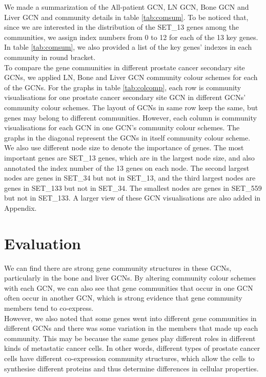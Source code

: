 \documentclass[12pt,a4paper]{report}
\begin{document}
We made a summarization of the All-patient GCN, LN GCN, Bone GCN and Liver GCN and community details in table \ref{tab:comsum}.  To be noticed that, since we are interested in the distribution of the SET\_13 genes among the communities, we assign index numbers from 0 to 12 for each of the 13 key genes. In table \ref{tab:comsum}, we also provided a list of the key genes' indexes in each community in round bracket.\\

To compare the gene communities in different prostate cancer secondary site GCNs, we applied LN, Bone and Liver GCN community colour schemes for each of the GCNs. For the graphs in table \ref{tab:colcomp}, each row is community visualisations for one prostate cancer secondary site GCN in different GCNs’ community colour schemes. The layout of GCNs in same row keep the same, but genes may belong to different communities. However, each column is community visualisations for each GCN in one GCN’s community colour schemes. The graphs in the diagonal represent the GCNs in itself community colour scheme. We also use different node size to denote the importance of genes. The most important genes are SET\_13 genes, which are in the largest node size, and also annotated the index number of the 13 genes on each node. The second largest nodes are genes in SET\_34 but not in SET\_13, and the third largest nodes are genes in SET\_133 but not in SET\_34. The smallest nodes are genes in SET\_559 but not in SET\_133. A larger view of these GCN visualisations are also added in Appendix.\\

\section{Evaluation}
We can find there are strong gene community structures in these GCNs, particularly in the bone and liver GCNs. By altering community colour schemes with each GCN, we can also see that gene communities that occur in one GCN often occur in another GCN, which is strong evidence that gene community members tend to co-express.\\

However, we also noted that some genes went into different gene communities in different GCNs and there was some variation in the members that made up each community. This may be because the same genes play different roles in different kinds of metastatic cancer cells. In other words, different types of prostate cancer cells have different co-expression community structures, which allow the cells to synthesise different proteins and thus determine differences in cellular properties.\\
\end{document}
